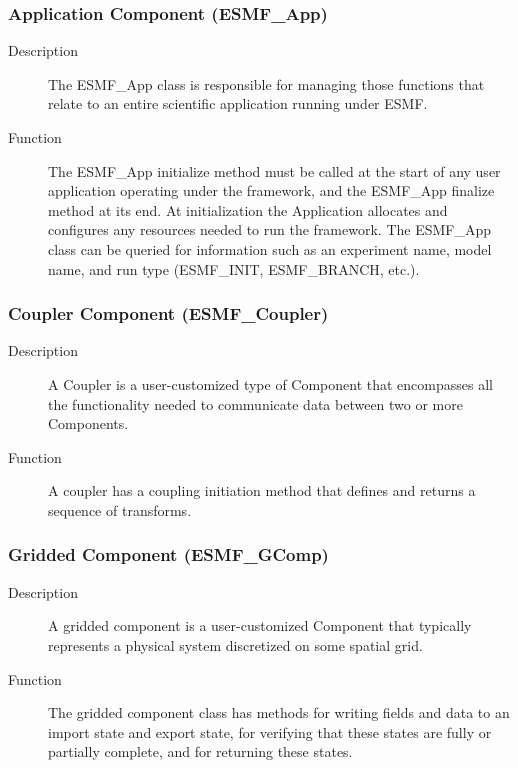 \subsubsection{Application Component (ESMF\_App)}
\begin{description} 
\item [Description] The ESMF\_App class is responsible for managing those 
functions that relate to an entire scientific application running under ESMF.
\item [Function]  The ESMF\_App initialize method 
must be called at the start of any user application operating under the framework, and
the ESMF\_App finalize method at its end.  At initialization the Application allocates and 
configures any resources needed to run the framework.  The ESMF\_App 
class can be queried 
for information such as an experiment name, model name, and run 
type (ESMF\_INIT, ESMF\_BRANCH, etc.).  
\end{description}

\subsubsection{Coupler Component (ESMF\_Coupler)}
\begin{description}
\item [Description] A Coupler is a user-customized type of Component that 
encompasses all the 
functionality needed to communicate data between two or more Components. 
\item [Function] A coupler has a coupling initiation method that defines and 
returns a sequence of transforms.
\end{description}

\subsubsection{Gridded Component (ESMF\_GComp)}
\label{sec:griddedcomponent} 
\begin{description}
\item [Description] A gridded component is a user-customized Component 
that typically represents a physical system discretized on some spatial grid.
\item [Function] The gridded component class has methods for writing 
fields and data to an import state and export state, for verifying that
these states are fully or partially complete, and for returning these
states.
\end{description}

